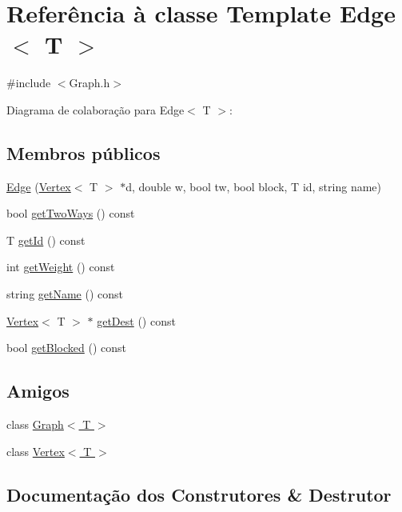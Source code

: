 \hypertarget{class_edge}{}\section{Referência à classe Template Edge$<$ T $>$}
\label{class_edge}


{\ttfamily \#include $<$Graph.\+h$>$}



Diagrama de colaboração para Edge$<$ T $>$\+:
\subsection*{Membros públicos}
\begin{DoxyCompactItemize}
\item 
\hyperlink{class_edge_aa83400a85aa2e50327bdc8ba854ad375}{Edge} (\hyperlink{class_vertex}{Vertex}$<$ T $>$ $\ast$d, double w, bool tw, bool block, T id, string name)
\item 
bool \hyperlink{class_edge_a330979d3f8be8f4f26889e046adf5eb2}{get\+Two\+Ways} () const 
\item 
T \hyperlink{class_edge_a655569c8bc3e9154d82a49ffebf0a8e6}{get\+Id} () const 
\item 
int \hyperlink{class_edge_a9c0f42ab235c2c427d2239bf5419b854}{get\+Weight} () const 
\item 
string \hyperlink{class_edge_a29153ede6a73b12918e3c05a9532cf4e}{get\+Name} () const 
\item 
\hyperlink{class_vertex}{Vertex}$<$ T $>$ $\ast$ \hyperlink{class_edge_a3805fa2e04f1e7f0495fbba6524ea823}{get\+Dest} () const 
\item 
bool \hyperlink{class_edge_a6b46f098c5d22a74ee404f34dd89c0eb}{get\+Blocked} () const 
\end{DoxyCompactItemize}
\subsection*{Amigos}
\begin{DoxyCompactItemize}
\item 
class \hyperlink{class_edge_aefa9b76cd57411c5354e5620dc2d84dd}{Graph$<$ T $>$}
\item 
class \hyperlink{class_edge_a2e120a12dec663fa334633b4f26cbed8}{Vertex$<$ T $>$}
\end{DoxyCompactItemize}


\subsection{Documentação dos Construtores \& Destrutor}
\hypertarget{class_edge_aa83400a85aa2e50327bdc8ba854ad375}{}
